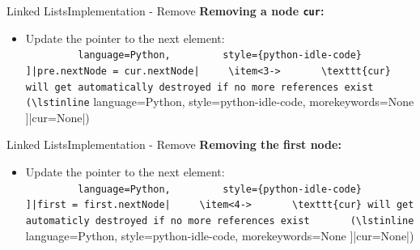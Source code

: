 
\begin{frame}{Linked Lists}{Implementation - Remove}
  \textbf{Removing a node \texttt{cur}:}
  \begin{itemize}
    \item<2->
      Update the pointer to the next element:\\
      \lstinline[
        language=Python,
        style={python-idle-code}
      ]|pre.nextNode = cur.nextNode|
    \item<3->
      \texttt{cur} will get automatically destroyed if no more references exist
      (\lstinline[
        language=Python,
        style={python-idle-code},
        morekeywords={None}
      ]|cur=None|)
  \end{itemize}
  \begin{flushleft}
    
  \end{flushleft}
\end{frame}




\begin{frame}{Linked Lists}{Implementation - Remove}
  \textbf{Removing the first node:}
    \begin{flushleft}
    
  \end{flushleft}
  \begin{itemize}
    \item<3->
      Update the pointer to the next element:\\
      \lstinline[
        language=Python,
        style={python-idle-code}
      ]|first = first.nextNode|
    \item<4->
      \texttt{cur} will get automaticly destroyed if no more references exist
      (\lstinline[
        language=Python,
        style={python-idle-code},
        morekeywords={None}
      ]|cur=None|)
  \end{itemize}
  \begin{flushright}
    
  \end{flushright}
\end{frame}

